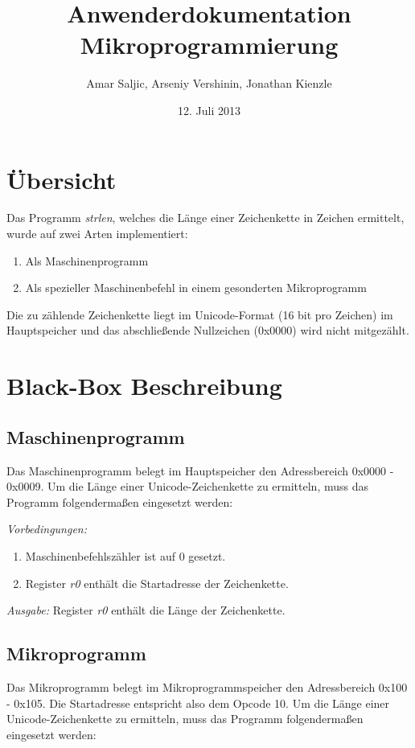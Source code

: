 \documentclass[12pt,a4paper]{article}
\title{Anwenderdokumentation Mikroprogrammierung}
\author{Amar Saljic, Arseniy Vershinin, Jonathan Kienzle}
\date{12. Juli 2013}
\begin{document}
\maketitle

\thispagestyle{fancy}

\section{Übersicht}

Das Programm \emph{strlen}, welches die Länge einer Zeichenkette in Zeichen ermittelt, wurde auf zwei Arten implementiert:
\begin{enumerate}
\item Als Maschinenprogramm
\item Als spezieller Maschinenbefehl in einem gesonderten Mikroprogramm
\end{enumerate}
Die zu zählende Zeichenkette liegt im Unicode-Format (16 bit pro Zeichen) im Hauptspeicher und das abschließende Nullzeichen (0x0000) wird nicht mitgezählt.

\section{Black-Box Beschreibung}

\subsection{Maschinenprogramm}
 	
Das Maschinenprogramm belegt im Hauptspeicher den Adressbereich 0x0000 - 0x0009. Um die Länge einer Unicode-Zeichenkette zu ermitteln, muss das Programm folgendermaßen eingesetzt werden:

\emph{Vorbedingungen:}
\begin {enumerate}
\item Maschinenbefehlszähler ist auf 0 gesetzt.
\item Register \emph{r0} enthält die Startadresse der Zeichenkette.
\end{enumerate}

\emph{Ausgabe:} Register \emph{r0} enthält die Länge der Zeichenkette.

\subsection{Mikroprogramm}
Das Mikroprogramm belegt im Mikroprogrammspeicher den Adressbereich 0x100 - 0x105. Die Startadresse entspricht also dem Opcode 10. Um die Länge einer Unicode-Zeichenkette zu ermitteln, muss das Programm folgendermaßen eingesetzt werden:
\end{document}
